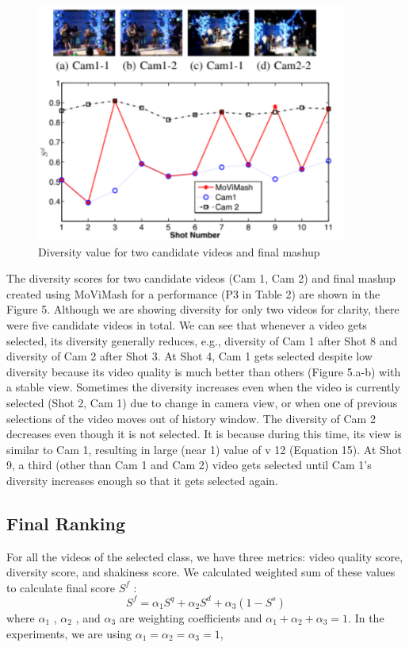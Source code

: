 \documentclass{sig-alternate-05-2015}
\begin{document}
\begin{figure}
\centering
\includegraphics[scale=1]{img5.png}
\caption{Diversity value for two candidate videos and final
mashup}
\end{figure}

The diversity scores for two candidate videos (Cam 1, Cam 2)
and final mashup created using MoViMash for a performance (P3
in Table 2) are shown in the Figure 5. Although we are showing
diversity for only two videos for clarity, there were five candidate
videos in total. We can see that whenever a video gets selected,
its diversity generally reduces, e.g., diversity of Cam 1 after Shot 8
and diversity of Cam 2 after Shot 3. At Shot 4, Cam 1 gets selected
despite low diversity because its video quality is much better than
others (Figure 5.a-b) with a stable view. Sometimes the diversity
increases even when the video is currently selected (Shot 2, Cam 1)
due to change in camera view, or when one of previous selections
of the video moves out of history window. The diversity of Cam 2
decreases even though it is not selected. It is because during this
time, its view is similar to Cam 1, resulting in large (near 1) value
of v 12 (Equation 15). At Shot 9, a third (other than Cam 1 and Cam
2) video gets selected until Cam 1's diversity increases enough so
that it gets selected again. 

\subsection{Final Ranking}
For all the videos of the selected class, we have three metrics:
video quality score, diversity score, and shakiness score. We calculated weighted sum of these values to calculate final score $S^f$ :
\begin{equation}
S^f=\alpha_1S^q+ \alpha_2S^d +\alpha_3(1-S^s )
\end{equation}
where $\alpha_1$ , $\alpha_2$ , and $\alpha_3$ are weighting coefficients and $\alpha_1 +\alpha_2 +
\alpha_3 = 1$. In the experiments, we are using $\alpha_1 =\alpha_2 =
\alpha_3 = 1$,
\end{document}
